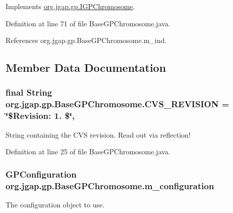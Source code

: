 Implements \hyperlink{interfaceorg_1_1jgap_1_1gp_1_1_i_g_p_chromosome_a6e828748e1d0dfb0f1120a6aafa67fd0}{org.\-jgap.\-gp.\-I\-G\-P\-Chromosome}.



Definition at line 71 of file Base\-G\-P\-Chromosome.\-java.



References org.\-jgap.\-gp.\-Base\-G\-P\-Chromosome.\-m\-\_\-ind.



\subsection{Member Data Documentation}
\hypertarget{classorg_1_1jgap_1_1gp_1_1_base_g_p_chromosome_ae4c4327ee83f75b3cce9b14abb51c59c}{
\subsubsection[{C\-V\-S\-\_\-\-R\-E\-V\-I\-S\-I\-O\-N}]{\setlength{\rightskip}{0pt plus 5cm}final String org.\-jgap.\-gp.\-Base\-G\-P\-Chromosome.\-C\-V\-S\-\_\-\-R\-E\-V\-I\-S\-I\-O\-N = \char`\"{}\$Revision\-: 1. \$\char`\"{}\hspace{0.3cm}{\ttfamily [static]}, {\ttfamily [private]}}}\label{classorg_1_1jgap_1_1gp_1_1_base_g_p_chromosome_ae4c4327ee83f75b3cce9b14abb51c59c}
String containing the C\-V\-S revision. Read out via reflection! 

Definition at line 25 of file Base\-G\-P\-Chromosome.\-java.

\hypertarget{classorg_1_1jgap_1_1gp_1_1_base_g_p_chromosome_a1338f1d889a4190afaaca96b3f8896e3}{
\subsubsection[{m\-\_\-configuration}]{\setlength{\rightskip}{0pt plus 5cm}G\-P\-Configuration org.\-jgap.\-gp.\-Base\-G\-P\-Chromosome.\-m\-\_\-configuration\hspace{0.3cm}{\ttfamily [private]}}}\label{classorg_1_1jgap_1_1gp_1_1_base_g_p_chromosome_a1338f1d889a4190afaaca96b3f8896e3}
The configuration object to use. 

